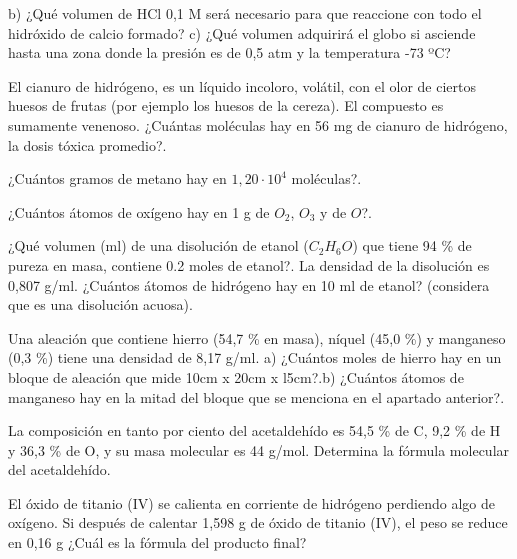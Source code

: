 \begin{multicols}{2}
\begin{problem}
b)	¿Qué volumen de HCl 0,1 M será necesario para que reaccione con todo el hidróxido de calcio formado?
c)	¿Qué volumen adquirirá el globo si asciende hasta una zona donde la presión es de 0,5 atm y la temperatura -73 ºC?
\end{problem}
\begin{problem}
El cianuro de hidrógeno, es un líquido incoloro, volátil, con el olor de ciertos huesos de frutas (por ejemplo los huesos de la cereza). El compuesto es sumamente venenoso. ¿Cuántas moléculas hay en 56 mg de cianuro de hidrógeno, la dosis tóxica promedio?.
\end{problem}
\begin{problem}
¿Cuántos gramos de metano hay en $1,20\cdot 10^4$ moléculas?.
\end{problem}
\begin{problem}
¿Cuántos átomos de oxígeno hay en 1 g de $O_2$, $O_3$ y de $O$?.	
\end{problem}
\begin{problem}
¿Qué volumen (ml) de una disolución de etanol ($C_2H_6O$) que tiene 94 \% de pureza en masa, contiene 0.2 moles de etanol?. La densidad de la disolución es 0,807 g/ml. ¿Cuántos átomos de hidrógeno hay en 10 ml de etanol? (considera que es una disolución acuosa).	
\end{problem}
\begin{problem}
Una aleación que contiene hierro (54,7 \% en masa), níquel (45,0 \%) y manganeso (0,3 \%) tiene una densidad de 8,17 g/ml. a) ¿Cuántos moles de hierro hay en un bloque de aleación que mide 10cm x 20cm x l5cm?.b) ¿Cuántos átomos de manganeso hay en la mitad del bloque que se menciona en el apartado anterior?.	
\end{problem}
\begin{problem}
La composición en tanto por ciento del acetaldehído es 54,5 \% de C, 9,2 \% de H y 36,3 \% de O, y su masa molecular es 44 g/mol. Determina la fórmula molecular del acetaldehído.
\end{problem}
\begin{problem}
El óxido de titanio (IV) se calienta en corriente de hidrógeno perdiendo algo de oxígeno. Si después de calentar 1,598 g de óxido de titanio (IV), el peso se reduce en 0,16 g ¿Cuál es la fórmula del producto final?	
\end{problem}
\begin{problem}
	
\end{problem}

\end{multicols}